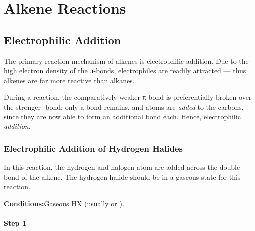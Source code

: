 
	\pagebreak
	\section{Alkene Reactions}

	\subsection{Electrophilic Addition}

		The primary reaction mechanism of alkenes is electrophilic addition. Due to the high electron density of the π-bonds,
		electrophiles are readily attracted –– thus alkenes are far more reactive than alkanes.

		During a reaction, the comparatively weaker π-bond is preferentially broken over the stronger \chemsigma-bond; only a
		 bond remains, and atoms are \textit{added} to the carbons, since they are now able to form an additional
		bond each. Hence, electrophilic \textit{addition}.

		\subsubsection{Electrophilic Addition of Hydrogen Halides}

			In this reaction, the hydrogen and halogen atom are added across the double bond of the alkene. The hydrogen halide
			should be in a gaseous state for this reaction.

			\vspace{1.5em}
			\vbox{\textbf{Conditions:}\tabto{35mm}Gaseous HX (usually  or ).}

			\paragraph{Step 1}


